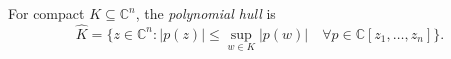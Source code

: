 
For compact $K\subseteq\mathbb C^n$, the \emph{polynomial hull} is
\[
\widehat K=\{z\in\mathbb C^n:|p(z)|\le\sup_{w\in K}|p(w)|\quad\forall p\in\mathbb C[z_1,\ldots,z_n]\}.
\]
